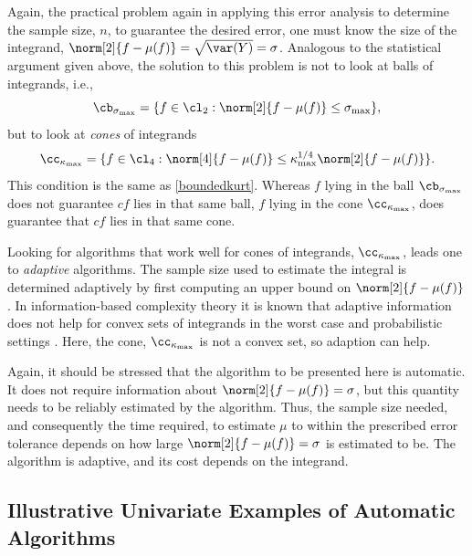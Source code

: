 \documentclass[graybox]{svmult}
\begin{document}
Again, the practical problem again in applying this error analysis to determine the sample size, $n$, to guarantee the desired error, one must know the size of the integrand, $\norm[2]{f-\mu(f)}=\sqrt{\var(Y)}=\sigma$.  Analogous to the statistical argument given above, the solution to this problem is not to look at balls of integrands, i.e., 
\begin{equation} \label{ballintegdef}
\cb_{\sigma_{\max}} = \{ f \in \cl_2 : \norm[2]{f-\mu(f)} \le \sigma_{\max}\}, 
\end{equation}
but to look at \emph{cones} of integrands 
\begin{equation}\label{coneintegdef}
\cc_{\kappa_{\max}} = \{f \in \cl_4 : \norm[4]{f-\mu(f)} \le \kappa_{\max}^{1/4} \norm[2]{f-\mu(f)} \}.
\end{equation}
This condition is the same as \eqref{boundedkurt}.  Whereas $f$ lying in the ball  $\cb_{\sigma_{\max}}$ does not guarantee $cf$ lies in that same ball, $f$ lying in the cone $\cc_{\kappa_{\max}}$, does guarantee that $cf$ lies in that same cone.

Looking for algorithms that work well for cones of integrands, $\cc_{\kappa_{\max}}$, leads one to \emph{adaptive} algorithms.  The sample size used to estimate the integral is determined adaptively by first computing an upper bound on $\norm[2]{f-\mu(f)}$.  In information-based complexity theory it is known that adaptive information does not help for convex sets of integrands in the worst case and probabilistic settings \citep[Chapter 4, Theorem 5.2.1; Chapter 8, Corollary 5.3.1]{TraWasWoz88}.  Here, the cone, $\cc_{\kappa_{\max}}$ is not a convex set, so adaption can help.

Again, it should be stressed that the algorithm to be presented here is automatic.  It does not require information about $\norm[2]{f-\mu(f)}=\sigma$, but this quantity needs to be reliably estimated by the algorithm. Thus, the sample size needed, and consequently the time required, to estimate $\mu$ to within the prescribed error tolerance depends on how large $\norm[2]{f-\mu(f)}=\sigma$ is estimated to be.  The algorithm is adaptive, and its cost depends on the integrand.

\subsection{Illustrative Univariate Examples of Automatic Algorithms}
\end{document}
